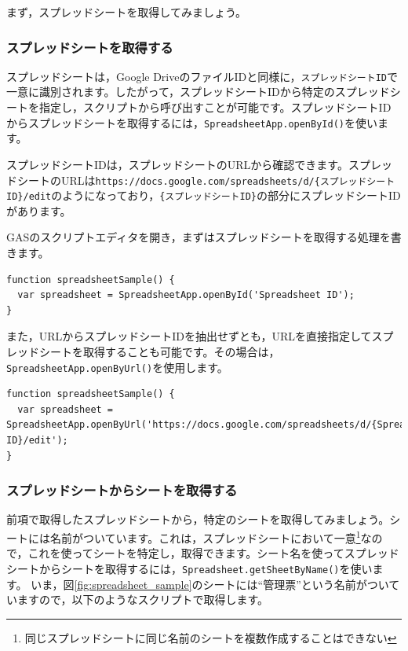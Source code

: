 \documentclass[uplatex,a4j]{jsarticle}
\begin{document}
まず，スプレッドシートを取得してみましょう。

\subsubsection{スプレッドシートを取得する}


スプレッドシートは，Google DriveのファイルIDと同様に，\verb|スプレッドシートID|で一意に識別されます。したがって，スプレッドシートIDから特定のスプレッドシートを指定し，スクリプトから呼び出すことが可能です。スプレッドシートIDからスプレッドシートを取得するには，\verb|SpreadsheetApp.openById()|を使います。

スプレッドシートIDは，スプレッドシートのURLから確認できます。スプレッドシートのURLは\verb|https://docs.google.com/spreadsheets/d/{スプレッドシートID}/edit|のようになっており，\verb|{スプレッドシートID}|の部分にスプレッドシートIDがあります。

GASのスクリプトエディタを開き，まずはスプレッドシートを取得する処理を書きます。

\begin{lstlisting}[basicstyle=\ttfamily\footnotesize,frame=single,caption=SpreadsheetApp sample 1]
function spreadsheetSample() {
  var spreadsheet = SpreadsheetApp.openById('Spreadsheet ID');
}
\end{lstlisting}

また，URLからスプレッドシートIDを抽出せずとも，URLを直接指定してスプレッドシートを取得することも可能です。その場合は，\verb|SpreadsheetApp.openByUrl()|を使用します。

\begin{lstlisting}[basicstyle=\ttfamily\footnotesize,frame=single,caption=SpreadsheetApp sample 2]
function spreadsheetSample() {
  var spreadsheet = SpreadsheetApp.openByUrl('https://docs.google.com/spreadsheets/d/{Spreadsheet ID}/edit');
}
\end{lstlisting}

\subsubsection{スプレッドシートからシートを取得する}


前項で取得したスプレッドシートから，特定のシートを取得してみましょう。シートには名前がついています。これは，スプレッドシートにおいて一意\footnote{同じスプレッドシートに同じ名前のシートを複数作成することはできない}なので，これを使ってシートを特定し，取得できます。シート名を使ってスプレッドシートからシートを取得するには，\verb|Spreadsheet.getSheetByName()|を使います。
いま，図\ref{fig:spreadsheet_sample}のシートには``管理票''という名前がついていますので，以下のようなスクリプトで取得します。
\end{document}
